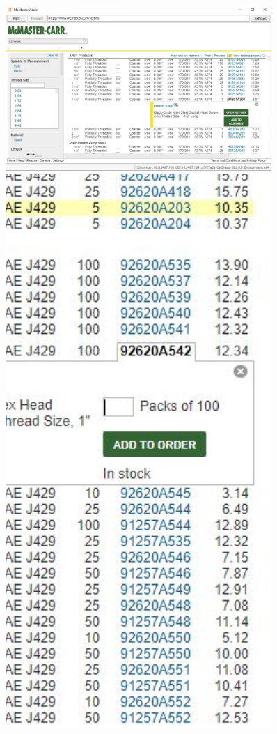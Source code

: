 \documentclass[12pt, letterpaper]{article}
\begin{document}
\begin{figure}[H]
    \centering    
    \begin{minipage}{0.6\textwidth}
        \includegraphics[width=0.9\textwidth]{Figures/webBrowserNewButtons.jpg}
    \end{minipage}
    \begin{minipage}{0.2\textwidth}
        \includegraphics[width=0.9\textwidth]{Figures/webBrowserOld.JPG}

\end{minipage}
\end{figure}
\end{document}
